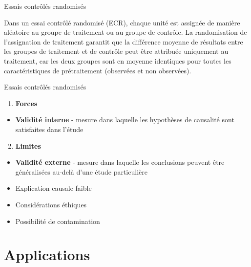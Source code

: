 \documentclass[ignorenonframetext,]{beamer}
\providecommand{\tightlist}{%
  \setlength{\itemsep}{0pt}\setlength{\parskip}{0pt}}
\begin{document}
\begin{frame}{Essais contrôlés randomisés}
\protect\hypertarget{essais-controles-randomises-2}{}

Dans un essai contrôlé randomisé (ECR), chaque unité est assignée de
manière aléatoire au groupe de traitement ou au groupe de contrôle. La
randomisation de l'assignation de traitement garantit que la différence
moyenne de résultats entre les groupes de traitement et de contrôle peut
être attribuée uniquement au traitement, car les deux groupes sont en
moyenne identiques pour toutes les caractéristiques de prétraitement
(observées et non observées).

\end{frame}

\begin{frame}{Essais contrôlés randomisés}
\protect\hypertarget{essais-controles-randomises-3}{}

\begin{enumerate}
\tightlist
\item
  \textbf{Forces}\\
\end{enumerate}

\begin{itemize}
\tightlist
\item
  \textbf{Validité interne} - mesure dans laquelle les hypothèses de
  causalité sont satisfaites dans l'étude
\end{itemize}

\begin{enumerate}
\setcounter{enumi}{1}
\tightlist
\item
  \textbf{Limites}
\end{enumerate}

\begin{itemize}
\tightlist
\item
  \textbf{Validité externe} - mesure dans laquelle les conclusions
  peuvent être généralisées au-delà d'une étude particulière
\item
  Explication causale faible
\item
  Considérations éthiques
\item
  Possibilité de contamination
\end{itemize}

\end{frame}

\hypertarget{applications}{%
\section{Applications}\label{applications}}
\end{document}
